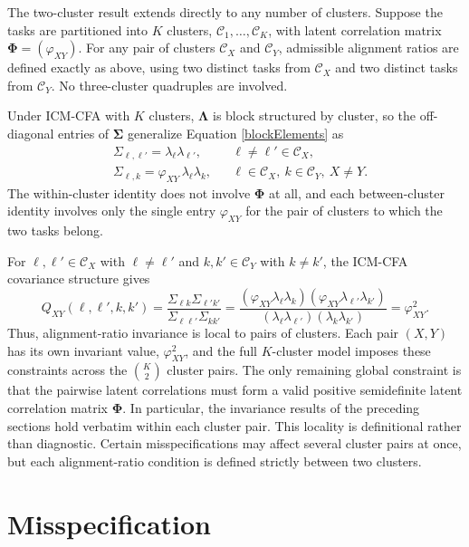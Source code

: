 \documentclass[
  american,
  man,floatsintext]{apa7}
\begin{document}
The two-cluster result extends directly to any number of clusters. Suppose the tasks are partitioned into \(K\) clusters, \(\mathcal C_1,\ldots,\mathcal C_K\), with latent correlation matrix \(\pmb\Phi=(\varphi_{XY})\). For any pair of clusters \(\mathcal C_X\) and \(\mathcal C_Y\), admissible alignment ratios are defined exactly as above, using two distinct tasks from \(\mathcal C_X\) and two distinct tasks from \(\mathcal C_Y\). No three-cluster quadruples are involved.

Under ICM-CFA with \(K\) clusters, \(\pmb\Lambda\) is block structured by cluster, so the off-diagonal entries of \(\pmb\Sigma\) generalize Equation \eqref{blockElements} as
\[
\begin{aligned}
&\Sigma_{\ell,\ell'} = \lambda_\ell \lambda_{\ell'}, && \ell\neq \ell'\in\mathcal C_X,\\
&\Sigma_{\ell,k} = \varphi_{XY}\, \lambda_\ell \lambda_k, && \ell\in \mathcal C_X,\ k\in \mathcal C_Y,\ X\neq Y.
\end{aligned}
\]
The within-cluster identity does not involve \(\pmb\Phi\) at all, and each between-cluster identity involves only the single entry \(\varphi_{XY}\) for the pair of clusters to which the two tasks belong.

For \(\ell,\ell'\in\mathcal C_X\) with \(\ell\neq \ell'\) and \(k,k'\in\mathcal C_Y\) with \(k\neq k'\), the ICM-CFA covariance structure gives
\begin{equation}\label{pairwiseQ}
Q_{XY}(\ell,\ell',k,k')=
\frac{\Sigma_{\ell k}\Sigma_{\ell'k'}}
{\Sigma_{\ell\ell'}\Sigma_{kk'}}=
\frac{(\varphi_{XY}\lambda_\ell\lambda_k)(\varphi_{XY}\lambda_{\ell'}\lambda_{k'})}
{(\lambda_\ell\lambda_{\ell'})(\lambda_k\lambda_{k'})}=
\varphi_{XY}^2.
\end{equation}
Thus, alignment-ratio invariance is local to pairs of clusters. Each pair \((X,Y)\) has its own invariant value, \(\varphi_{XY}^2\), and the full \(K\)-cluster model imposes these constraints across the \(\binom K2\) cluster pairs. The only remaining global constraint is that the pairwise latent correlations must form a valid positive semidefinite latent correlation matrix \(\pmb\Phi\). In particular, the invariance results of the preceding sections hold verbatim within each cluster pair. This locality is definitional rather than diagnostic. Certain misspecifications may affect several cluster pairs at once, but each alignment-ratio condition is defined strictly between two clusters.

\section{Misspecification}\label{misspecification}
\end{document}
